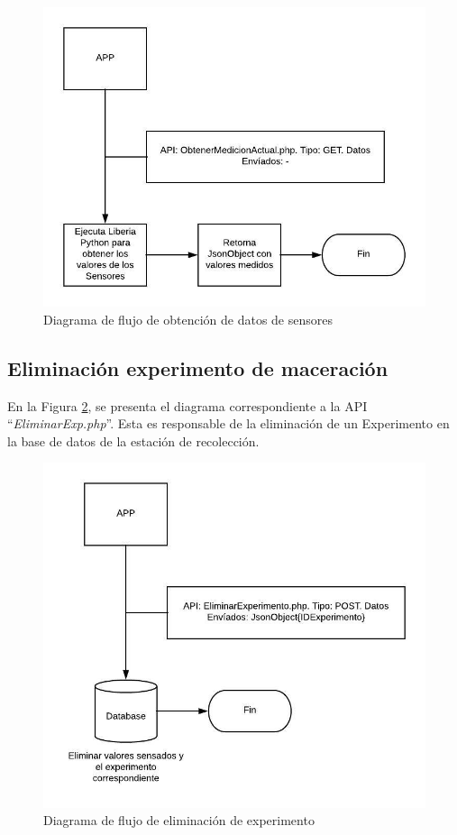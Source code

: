             \begin{figure}[htb]
                \centering
                \includegraphics{DiagramaGetTempPh.jpeg}
                \caption{Diagrama de flujo de obtención de datos de sensores}
                \label{fig:ApiGetTempPh}
            \end{figure}
        
        \subsection{Eliminación experimento de maceración}
        \par En la Figura \ref{fig:ApiRemoveExp}, se presenta el diagrama correspondiente a la API ``\textit{EliminarExp.php}''. Esta es responsable de la eliminación de un Experimento en la base de datos de la estación de recolección.
            \begin{figure} [htb]
                \centering
                \includegraphics{DiagramaRemoveExp.jpeg}
                \caption{Diagrama de flujo de eliminación de experimento}
                \label{fig:ApiRemoveExp}
            \end{figure}
            
